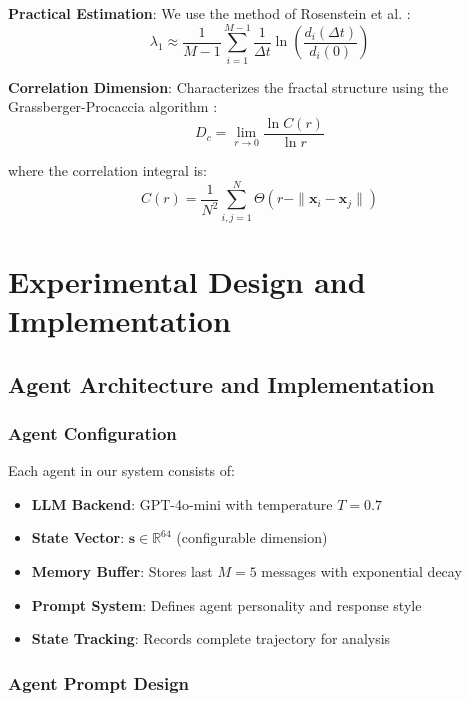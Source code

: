 \documentclass[11pt,a4paper]{article}
\begin{document}
\textbf{Practical Estimation}: We use the method of Rosenstein et al. \cite{rosenstein}:
\begin{equation}
\lambda_1 \approx \frac{1}{M-1} \sum_{i=1}^{M-1} \frac{1}{\Delta t} \ln\left(\frac{d_i(\Delta t)}{d_i(0)}\right)
\label{eq:lyapunov_practical}
\end{equation}

\textbf{Correlation Dimension}: Characterizes the fractal structure using the Grassberger-Procaccia algorithm \cite{grassberger}:
\begin{equation}
D_c = \lim_{r \to 0} \frac{\ln C(r)}{\ln r}
\label{eq:correlation_dim}
\end{equation}

where the correlation integral is:
\begin{equation}
C(r) = \frac{1}{N^2} \sum_{i,j=1}^{N} \Theta(r - \|\mathbf{x}_i - \mathbf{x}_j\|)
\label{eq:correlation_integral}
\end{equation}

\section{Experimental Design and Implementation}

\subsection{Agent Architecture and Implementation}

\subsubsection{Agent Configuration}

Each agent in our system consists of:
\begin{itemize}
    \item \textbf{LLM Backend}: GPT-4o-mini with temperature $T = 0.7$
    \item \textbf{State Vector}: $\mathbf{s} \in \mathbb{R}^{64}$ (configurable dimension)
    \item \textbf{Memory Buffer}: Stores last $M = 5$ messages with exponential decay
    \item \textbf{Prompt System}: Defines agent personality and response style
    \item \textbf{State Tracking}: Records complete trajectory for analysis
\end{itemize}

\subsubsection{Agent Prompt Design}
\end{document}
